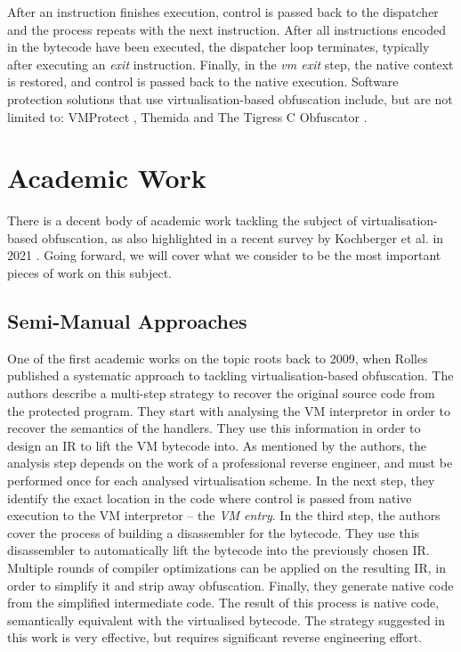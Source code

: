 After an instruction finishes execution, control is passed back to the dispatcher and the process repeats with the next instruction. After all instructions encoded in the bytecode have been executed, the dispatcher loop terminates, typically after executing an \emph{exit} instruction. Finally, in the \emph{vm exit} step, the native context is restored, and control is passed back to the native execution. Software protection solutions that use virtualisation-based obfuscation include, but are not limited to: VMProtect \cite{vmprotect}, Themida \cite{themida} and The Tigress C Obfuscator \cite{tigress}. 

\section{Academic Work}

There is a decent body of academic work tackling the subject of virtualisation-based obfuscation, as also highlighted in a recent survey by Kochberger et al. in 2021 \cite{kochberger2021sok}. Going forward, we will cover what we consider to be the most important pieces of work on this subject.

\subsection{Semi-Manual Approaches}

One of the first academic works on the topic roots back to 2009, when Rolles \cite{rolles2009unpacking} published a systematic approach to tackling virtualisation-based obfuscation. The authors describe a multi-step strategy to recover the original source code from the protected program. They start with analysing the \gls{VM} interpretor in order to recover the semantics of the handlers. They use this information in order to design an \gls{IR} to lift the \gls{VM} bytecode into. As mentioned by the authors, the analysis step depends on the work of a professional reverse engineer, and must be performed once for each analysed virtualisation scheme. In the next step, they identify the exact location in the code where control is passed from native execution to the \gls{VM} interpretor -- the \emph{\gls{VM} entry}. In the third step, the authors cover the process of building a disassembler for the bytecode. They use this disassembler to automatically lift the bytecode into the previously chosen \gls{IR}. Multiple rounds of compiler optimizations can be applied on the resulting \gls{IR}, in order to simplify it and strip away obfuscation. Finally, they generate native  code from the simplified intermediate code. The result of this process is native code, semantically equivalent with the virtualised bytecode. The strategy suggested in this work is very effective, but requires significant reverse engineering effort.


